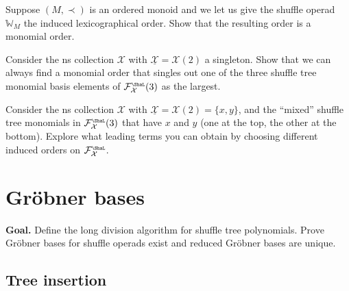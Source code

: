 \documentclass[fleqn, a4paper, twoside]{article}
\newcommand{\Sha}{{\scaleobj{0.75}{\ShaL}}}
\newcommand{\0}{\langle 0\rangle}
\newcommand{\XX}{\mathcal{X}}
\newcommand{\FF}{\mathcal{F}}
\DeclareRobustCommand{\[}{\begin{equation}}%
\DeclareRobustCommand{\]}{\end{equation}}%
\theoremstyle{mytheorem}
\theoremstyle{introthm}
\theoremstyle{mydefinition}
\theoremstyle{mydefinition2}
\theoremstyle{plain} %
\newcommand{\?}{\,?\,}
\theoremstyle{mytheorem}
\theoremstyle{plain} %
\newcommand\blankpage{%
    \null
    \thispagestyle{empty}%
    \newpage}
\begin{document}
\begin{question}\label{ex:orderedM}
Suppose $(M,\prec)$ is an ordered monoid and
we let us give the shuffle operad
$\mathbb{W}_M$ the induced lexicographical 
order. Show that the resulting order is a monomial
order.
\end{question}

\begin{question}
Consider the ns collection $\XX$ with $\underline{\XX} = \XX(2)$
a singleton. Show that we can always find a monomial order that
singles out one of the three shuffle tree monomial basis
elements of $\FF_\XX^\Sha(3)$ as the largest. 
\end{question}

\begin{question}
Consider the ns collection $\XX$ with $\underline{\XX} = \XX(2)
= \{x,y\}$, and the ``mixed'' shuffle tree monomials in 
$\FF_\XX^\Sha(3)$ that have $x$ and $y$ (one at the top,
the other at the bottom). Explore what leading terms
you can obtain by choosing different induced orders
on $\FF_\XX^\Sha$.
\end{question}

\afterpage{\blankpage}
 \pagebreak
 
\section{Gr\"obner bases}

\textbf{Goal.} Define the long division algorithm for shuffle
tree polynomials. Prove Gr\"obner bases for shuffle operads exist
and reduced Gr\"obner bases are unique.

\subsection{Tree insertion}
\end{document}
